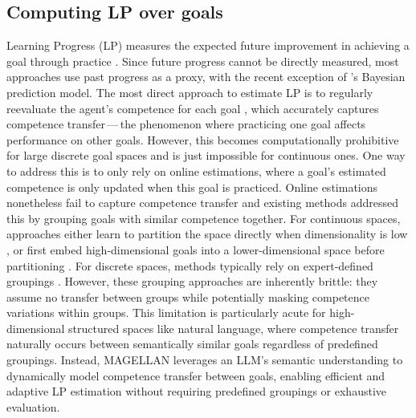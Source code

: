 \subsection{Computing LP over goals} \label{sec:related_work_lp}
Learning Progress (LP) measures the expected future improvement in achieving a goal through practice \citep{oudeyer_intrinsic_2007}. Since future progress cannot be directly measured, most approaches use past progress as a proxy, with the recent exception of \cite{kumar_practice_2024}'s Bayesian prediction model. The most direct approach to estimate LP is to regularly reevaluate the agent's competence for each goal \citep{kanitscheider_multi-task_2021,zhang_omni_2024}, which accurately captures competence transfer\,---\,the phenomenon where practicing one goal affects performance on other goals. However, this becomes computationally prohibitive for large discrete goal spaces and is just impossible for continuous ones. 
One way to address this is to only rely on online estimations, where a goal's estimated competence is only updated when this goal is practiced. Online estimations nonetheless fail to capture competence transfer and existing methods addressed this by grouping goals with similar competence together. For continuous spaces, approaches either learn to partition the space directly when dimensionality is low \citep{oudeyer_intrinsic_2007,baranes_active_2013,portelas_teacher_2019}, or first embed high-dimensional goals into a lower-dimensional space before partitioning \citep{laversanne-finot_curiosity_2018,kovac_grimgep_2023}. For discrete spaces, methods typically rely on expert-defined groupings \citep{stout_competence_2010,matiisen_teacher-student_2017}. However, these grouping approaches are inherently brittle: they assume no transfer between groups while potentially masking competence variations within groups. This limitation is particularly acute for high-dimensional structured spaces like natural language, where competence transfer naturally occurs between semantically similar goals regardless of predefined groupings. Instead, MAGELLAN leverages an LLM's semantic understanding to dynamically model competence transfer between goals, enabling efficient and adaptive LP estimation without requiring predefined groupings or exhaustive evaluation.

